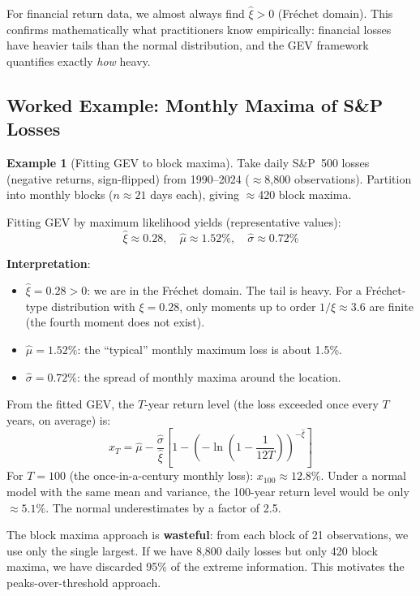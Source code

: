\documentclass[11pt, a4paper]{article}
\theoremstyle{definition}
\newtheorem{example}{Example}[section]
\theoremstyle{plain}
\theoremstyle{remark}
\begin{document}
\begin{keyresult}
For financial return data, we almost always find $\hat\xi > 0$ (Fr\'echet domain).
This confirms mathematically what practitioners know empirically:
financial losses have heavier tails than the normal distribution,
and the GEV framework quantifies exactly \emph{how} heavy.
\end{keyresult}

\subsection{Worked Example: Monthly Maxima of S\&P Losses}

\begin{example}[Fitting GEV to block maxima]\label{ex:gev-fit}
Take daily S\&P~500 losses (negative returns, sign-flipped) from 1990--2024 ($\approx$8{,}800 observations).
Partition into monthly blocks ($n \approx 21$ days each), giving $\approx$420 block maxima.

Fitting GEV by maximum likelihood yields (representative values):
\[
    \hat\xi \approx 0.28, \quad \hat\mu \approx 1.52\%, \quad \hat\sigma \approx 0.72\%
\]

\textbf{Interpretation}:
\begin{itemize}
    \item $\hat\xi = 0.28 > 0$: we are in the Fr\'echet domain. The tail is heavy.
      For a Fr\'echet-type distribution with $\xi = 0.28$, only moments up to order $1/\xi \approx 3.6$ are finite
      (the fourth moment does not exist).
    \item $\hat\mu = 1.52\%$: the ``typical'' monthly maximum loss is about 1.5\%.
    \item $\hat\sigma = 0.72\%$: the spread of monthly maxima around the location.
\end{itemize}

From the fitted GEV, the $T$-year return level (the loss exceeded once every $T$ years, on average) is:
\[
    x_T = \hat\mu - \frac{\hat\sigma}{\hat\xi}\left[1 - \left(-\ln\!\left(1 - \frac{1}{12T}\right)\right)^{-\hat\xi}\right]
\]
For $T = 100$ (the once-in-a-century monthly loss): $x_{100} \approx 12.8\%$.
Under a normal model with the same mean and variance, the 100-year return level would be only $\approx 5.1\%$.
The normal underestimates by a factor of 2.5.
\end{example}

\begin{warningbox}
The block maxima approach is \textbf{wasteful}: from each block of 21 observations,
we use only the single largest.
If we have 8{,}800 daily losses but only 420 block maxima,
we have discarded 95\% of the extreme information.
This motivates the peaks-over-threshold approach.
\end{warningbox}
\end{document}
